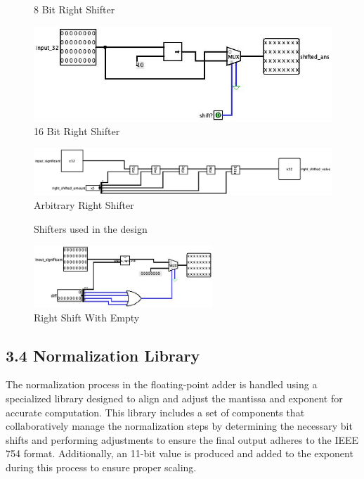 \documentclass{article}
\begin{document}
\begin{figure}[h!]
\begin{minipage}{0.3\textwidth}
    8 Bit Right Shifter
    \label{fig:8_bit_right_shift}
\end{minipage} 
\hfill
\begin{minipage}{0.3\textwidth}
    \centering
    \includegraphics[width=\linewidth]{16.jpg}
    16 Bit Right Shifter
    \label{fig:16_bit_right_shift}
\end{minipage} 
\hfill
\begin{minipage}{0.3\textwidth}
    \centering
    \includegraphics[width=\linewidth]{a.png}
    Arbitrary Right Shifter
    \label{fig:arbitrary_right_shift}
\end{minipage} 
\caption{Shifters used in the design}
\label{fig:shifters}
\end{figure}

\begin{figure}[h!]
\centering
\includegraphics[width=0.6\textwidth]{r.jpg}  %
\caption{Right Shift With Empty}
\label{fig:right_shift_with_empty}
\end{figure}



\subsection*{3.4 Normalization Library}

The normalization process in the floating-point adder is handled using a specialized library designed to align and adjust the mantissa and exponent for accurate computation. This library includes a set of components that collaboratively manage the normalization steps by determining the necessary bit shifts and performing adjustments to ensure the final output adheres to the IEEE 754 format. Additionally, an 11-bit value is produced and added to the exponent during this process to ensure proper scaling.
\end{document}
